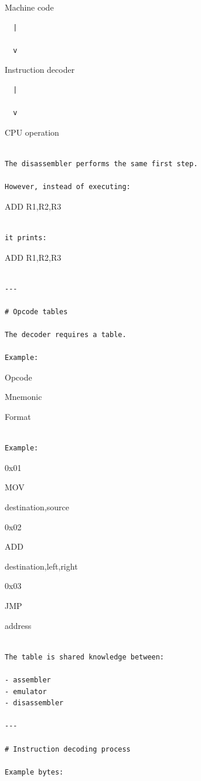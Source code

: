 \documentclass[
  oneside,
  openany]{book}
\begin{document}
Machine code

\begin{verbatim}
  |

  v
\end{verbatim}

Instruction decoder

\begin{verbatim}
  |

  v
\end{verbatim}

CPU operation

\begin{verbatim}

The disassembler performs the same first step.

However, instead of executing:
\end{verbatim}

ADD R1,R2,R3

\begin{verbatim}

it prints:
\end{verbatim}

ADD R1,R2,R3

\begin{verbatim}

---

# Opcode tables

The decoder requires a table.

Example:
\end{verbatim}

Opcode

Mnemonic

Format

\begin{verbatim}

Example:
\end{verbatim}

0x01

MOV

destination,source

0x02

ADD

destination,left,right

0x03

JMP

address

\begin{verbatim}

The table is shared knowledge between:

- assembler
- emulator
- disassembler

---

# Instruction decoding process

Example bytes:
\end{verbatim}
\end{document}
